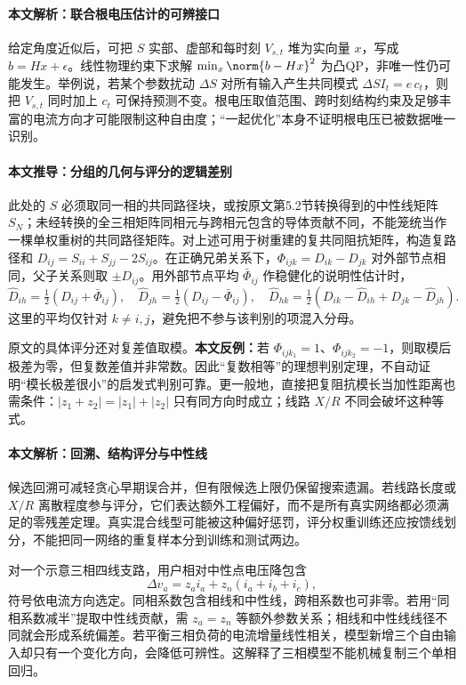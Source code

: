 \paragraph{本文解析：联合根电压估计的可辨接口}
给定角度近似后，可把 $S$ 实部、虚部和每时刻 $V_{s,t}$ 堆为实向量 $x$，写成 $b=Hx+\epsilon$。线性物理约束下求解 $\min_x\norm{b-Hx}^2$ 为凸QP，非唯一性仍可能发生。举例说，若某个参数扰动 $\Delta S$ 对所有输入产生共同模式 $\Delta S I_t=e\,c_t$，则把 $V_{s,t}$ 同时加上 $c_t$ 可保持预测不变。根电压取值范围、跨时刻结构约束及足够丰富的电流方向才可能限制这种自由度；“一起优化”本身不证明根电压已被数据唯一识别。

\paragraph{本文推导：分组的几何与评分的逻辑差别}
此处的 $S$ 必须取同一相的共同路径块，或按原文第5.2节转换得到的中性线矩阵 $S_N$；未经转换的全三相矩阵同相元与跨相元包含的导体贡献不同，不能笼统当作一棵单权重树的共同路径矩阵。对上述可用于树重建的复共同阻抗矩阵，构造复路径和 $D_{ij}=S_{ii}+S_{jj}-2S_{ij}$。在正确兄弟关系下，$\Phi_{ijk}=D_{ik}-D_{jk}$ 对外部节点相同，父子关系则取 $\pm D_{ij}$。用外部节点平均 $\bar\Phi_{ij}$ 作稳健化的说明性估计时，
\begin{equation}
 \widehat D_{ih}=\tfrac12(D_{ij}+\bar\Phi_{ij}),\quad
 \widehat D_{jh}=\tfrac12(D_{ij}-\bar\Phi_{ij}),\quad
 \widehat D_{hk}=\tfrac12(D_{ik}-\widehat D_{ih}+D_{jk}-\widehat D_{jh}).
\end{equation}
这里的平均仅针对 $k\ne i,j$，避免把不参与该判别的项混入分母。

原文的具体评分还对复差值取模。\textbf{本文反例：}若 $\Phi_{ijk_1}=1$、$\Phi_{ijk_2}=-1$，则取模后极差为零，但复数差值并非常数。因此“复数相等”的理想判别定理，不自动证明“模长极差很小”的启发式判别可靠。更一般地，直接把复阻抗模长当加性距离也需条件：$|z_1+z_2|=|z_1|+|z_2|$ 只有同方向时成立；线路 $X/R$ 不同会破坏这种等式。

\paragraph{本文解析：回溯、结构评分与中性线}
候选回溯可减轻贪心早期误合并，但有限候选上限仍保留搜索遗漏。若线路长度或 $X/R$ 离散程度参与评分，它们表达额外工程偏好，而不是所有真实网络都必须满足的零残差定理。真实混合线型可能被这种偏好惩罚，评分权重训练还应按馈线划分，不能把同一网络的重复样本分到训练和测试两边。

对一个示意三相四线支路，用户相对中性点电压降包含
\begin{equation}
 \Delta v_a=z_a i_a+z_n(i_a+i_b+i_c),
\end{equation}
符号依电流方向选定。同相系数包含相线和中性线，跨相系数也可非零。若用“同相系数减半”提取中性线贡献，需 $z_a=z_n$ 等额外参数关系；相线和中性线线径不同就会形成系统偏差。若平衡三相负荷的电流增量线性相关，模型新增三个自由输入却只有一个变化方向，会降低可辨性。这解释了三相模型不能机械复制三个单相回归。

